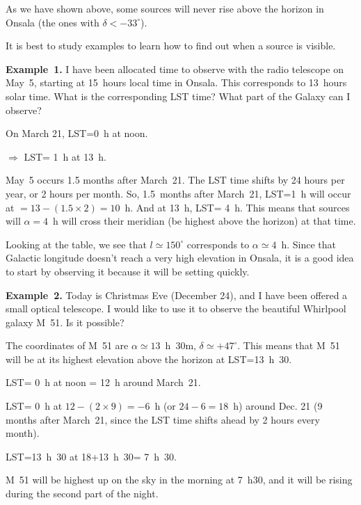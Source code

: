 As we have shown above, some sources will never rise above the horizon in Onsala 
(the ones with $\delta < -33^\circ$).   

It is best to study examples 
to learn how to find out when a source is visible. 

\bigskip
{\bf Example~1.} I have been allocated time to observe with the radio telescope
on May~5, starting at 15~hours local time in Onsala.  
This corresponds to 13~hours solar time. 
What is the corresponding LST time? What part of the Galaxy can I observe? 

\smallskip
On March 21, LST=0~h at noon. 

$\Rightarrow$ LST= 1~h at 13~h. 

May~5 occurs 1.5 months after March~21. The LST time shifts by
24 hours per year, or 2 hours per month. So, 1.5~months after
March~21, LST=1~h will occur at $=13 -(1.5\times 2) = 10$~h. 
And at 13~h, LST= 4~h. This means that sources will $\alpha=4$~h
will cross their meridian (be highest above the horizon) 
at that time.  

Looking at the table, we see that $l\simeq 150^\circ$ corresponds to $\alpha\simeq 4$~h. 
Since that Galactic longitude doesn't reach a very high elevation in Onsala, it is a 
good idea to start by observing it because it will be setting quickly. 

\bigskip
{\bf Example~2.} Today is Christmas Eve (December 24), and I have been offered a small optical
telescope. I would like to use it to observe the beautiful Whirlpool galaxy M~51. 
Is it possible? 

\smallskip
The coordinates of M~51 are $\alpha\simeq13$~h~30m, $\delta\simeq+47^\circ$. 
This means that M~51 will be at its highest elevation above the horizon at
LST=13~h~30. 

LST= 0~h at noon = 12~h around March~21. 

LST= 0~h at $12-(2\times 9) = -6$~h (or $24-6=18$~h) around Dec. 21 (9 months after March~21, 
since the LST time shifts ahead by 2 hours every month). 

LST=13~h~30 at 18+13~h~30= 7~h~30.  

M~51 will be highest up on the sky in the morning at 7~h30, and it will be rising during the
second part of the night. 




